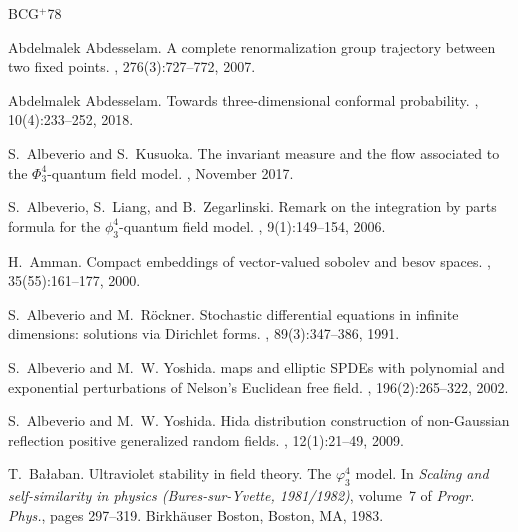 \documentclass[a4paper,11pt]{article}
\numberwithin{equation}{section}
\begin{document}
\newcommand{\etalchar}[1]{$^{#1}$}
\begin{thebibliography}{BCG{\etalchar{+}}78}

Abdelmalek Abdesselam.
\newblock A complete renormalization group trajectory between two fixed points.
, 276(3):727--772, 2007.

Abdelmalek Abdesselam.
\newblock Towards three-dimensional conformal probability.
, 10(4):233--252, 2018.

S.~Albeverio and S.~Kusuoka.
\newblock The invariant measure and the flow associated to the
  {$\Phi^4_3$}-quantum field model.
, November 2017.

S.~Albeverio, S.~Liang, and B.~Zegarlinski.
\newblock Remark on the integration by parts formula for the $\phi^4_3$-quantum
  field model.
, 9(1):149--154, 2006.

H.~Amman.
\newblock Compact embeddings of vector-valued sobolev and besov spaces.
, 35(55):161--177, 2000.

S.~Albeverio and M.~R\"ockner.
\newblock Stochastic differential equations in infinite dimensions: solutions
  via {Dirichlet} forms.
, 89(3):347--386, 1991.

S.~Albeverio and M.~W. Yoshida.
 maps and elliptic {SPDEs} with polynomial and exponential
  perturbations of {Nelson}'s {Euclidean} free field.
, 196(2):265--322, 2002.

S.~Albeverio and M.~W. Yoshida.
\newblock Hida distribution construction of non-{Gaussian} reflection positive
  generalized random fields.
, 12(1):21--49, 2009.

T.~Ba{\l}aban.
\newblock Ultraviolet stability in field theory. {T}he {$\varphi _{3}^{4}$}
  model.
\newblock In {\em Scaling and self-similarity in physics ({B}ures-sur-{Y}vette,
  1981/1982)}, volume~7 of {\em Progr. Phys.}, pages 297--319. Birkh\"{a}user
  Boston, Boston, MA, 1983.


\end{thebibliography}
\end{document}
